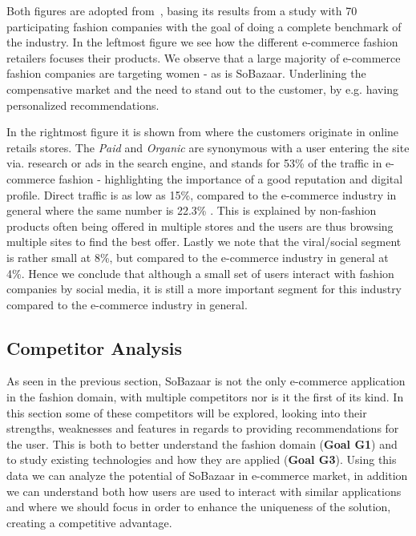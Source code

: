 Both figures are adopted from~\cite{Jorij2012}, basing its results from a study
with 70 participating fashion companies with the goal of doing a complete
benchmark of the industry. In the leftmost figure we see how the different
e-commerce fashion retailers focuses their products. We observe that a large
majority of e-commerce fashion companies are targeting women - as is
SoBazaar.  Underlining the compensative market and the need to stand out to
the customer, by e.g. having personalized recommendations.

In the rightmost figure it is shown from where the customers originate in
online retails stores. The \textit{Paid} and \textit{Organic} are synonymous
with a user entering the site via. research or ads in the search engine, and
stands for 53\% of the traffic in e-commerce fashion - highlighting the
importance of a good reputation and digital profile. Direct traffic is as low
as 15\%, compared to the e-commerce industry in general where the same number
is 22.3\% \cite{Jorij2012}. This is explained by non-fashion products often
being offered in multiple stores and the users are thus browsing multiple sites
to find the best offer. Lastly we note that the viral/social segment is rather
small at 8\%, but compared to the e-commerce industry in general at 4\%. Hence
we conclude that although a small set of users interact with fashion companies
by social media, it is still a more important segment for this industry
compared to the e-commerce industry in general.

\subsection{Competitor Analysis}
\label{subsec:competitors}


As seen in the previous section, SoBazaar is not the only e-commerce
application in the fashion domain, with multiple competitors nor is it the
first of its kind. In this section some of these competitors will be explored,
looking into their strengths, weaknesses and features in regards to providing
recommendations for the user. This is both to better understand the fashion
domain (\textbf{Goal G1}) and to study existing technologies and how they are
applied (\textbf{Goal G3}). Using this data we can analyze the potential of
SoBazaar in e-commerce market, in addition we can understand both how users are
used to interact with similar applications and where we should focus in order
to enhance the uniqueness of the solution, creating a competitive advantage.

